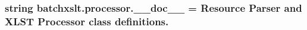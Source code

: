 \subsubsection[{\+\_\+\+\_\+doc\+\_\+\+\_\+}]{\setlength{\rightskip}{0pt plus 5cm}string batchxslt.\+processor.\+\_\+\+\_\+doc\+\_\+\+\_\+ = \textquotesingle{}Resource Parser and X\+L\+S\+T Processor class definitions.\textquotesingle{}}\label{namespacebatchxslt_1_1processor_ad92d28e39ae8cc54cc5e25c98cb3136e}
